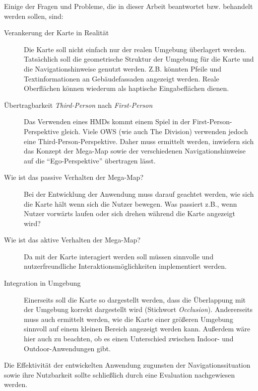 \documentclass[a4paper]{scrartcl}
\begin{document}
Einige der Fragen und Probleme, die in dieser Arbeit beantwortet bzw. behandelt werden sollen, sind:
\begin{description}
\item[Verankerung der Karte in Realität]
	Die Karte soll nicht einfach nur der realen Umgebung überlagert werden.
	Tatsächlich soll die geometrische Struktur der Umgebung für die Karte und die Navigationshinweise genutzt werden.
	Z.B. könnten Pfeile und Textinformationen an Gebäudefassaden angezeigt werden.
	Reale Oberflächen können wiederum als haptische Eingabeflächen dienen.
\item[Übertragbarkeit \emph{Third-Person} nach \emph{First-Person}]
	Das Verwenden eines HMDs kommt einem Spiel in der First-Person-Perspektive gleich.
	Viele OWS (wie auch The Division) verwenden jedoch eine Third-Person-Perspektive.
	Daher muss ermittelt werden, inwiefern sich das Konzept der Mega-Map sowie der verschiedenen Navigationshinweise auf die \enquote{Ego-Perspektive} übertragen lässt.
\item[Wie ist das passive Verhalten der Mega-Map?]
	Bei der Entwicklung der Anwendung muss darauf geachtet werden, wie sich die Karte hält wenn sich die Nutzer bewegen.
	Was passiert z.B., wenn Nutzer vorwärts laufen oder sich drehen während die Karte angezeigt wird?
\item[Wie ist das aktive Verhalten der Mega-Map?]
	Da mit der Karte interagiert werden soll müssen sinnvolle und nutzerfreundliche Interaktionsmöglichkeiten implementiert werden.
\item[Integration in Umgebung]
	Einerseits soll die Karte so dargestellt werden, dass die Überlappung mit der Umgebung korrekt dargestellt wird (Stichwort \emph{Occlusion}).
	Andererseits muss auch ermittelt werden, wie die Karte einer größeren Umgebung sinnvoll auf einem kleinen Bereich angezeigt werden kann.
	Außerdem wäre hier auch zu beachten, ob es einen Unterschied zwischen Indoor- und Outdoor-Anwendungen gibt.
\end{description}

Die Effektivität der entwickelten Anwendung zugunsten der Navigationssituation sowie ihre Nutzbarkeit sollte schließlich durch eine Evaluation nachgewiesen werden.

\printbibliography[nottype=online]
\printbibliography[title={Online Referenzen}, type=online]
\end{document}
